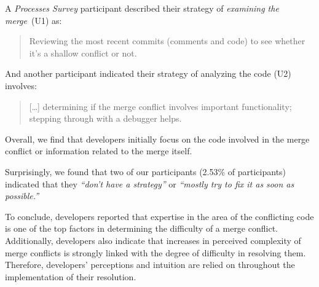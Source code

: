 A \textit{Processes Survey} participant described their strategy of \textit{examining the merge}~(U1) as:
\begin{quotation}
	Reviewing the most recent commits (comments and code) to see whether it's a shallow conflict or not.
\end{quotation}
	And another participant indicated their strategy of analyzing the code (U2) involves:
\begin{quotation}
[\ldots] determining if the merge conflict involves important functionality; stepping through with a debugger helps.
\end{quotation}
Overall, we find that developers initially focus on the code involved in the merge conflict or information related to the merge itself.

Surprisingly, we found that two of our participants (2.53\% of participants) indicated that they \textit{``don't have a strategy''} or \textit{``mostly try to fix it as soon as possible.''}


To conclude, developers reported that expertise in the area of the conflicting code is one of the top factors in determining the difficulty of a merge conflict.
Additionally, developers also indicate that increases in perceived complexity of merge conflicts is strongly linked with the degree of difficulty in resolving them.
Therefore, developers' perceptions and intuition are relied on throughout the implementation of their resolution.